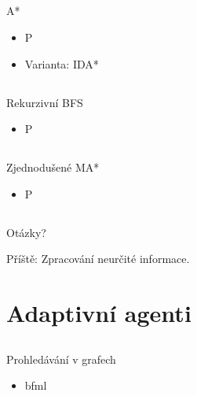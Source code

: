 \documentclass{beamer}
\begin{document}
\subsection{}
\begin{frame}{A*}
\begin{itemize}
\item P
\item Varianta: IDA*
\end{itemize}
\end{frame}

\subsection{}
\begin{frame}{Rekurzivní BFS}
\begin{itemize}
\item P
\end{itemize}
\end{frame}

\subsection{}
\begin{frame}{Zjednodušené MA*}
\begin{itemize}
\item P
\end{itemize}
\end{frame}

\subsection{}
\begin{frame}{Otázky?}
\begin{center}
Příště: Zpracování neurčité informace.
\end{center}
\end{frame}

\section{Adaptivní agenti}

\subsection{}
\begin{frame}{Prohledávání v grafech}
\begin{itemize}
\item bfml
\end{itemize}
\end{frame}
\end{document}
